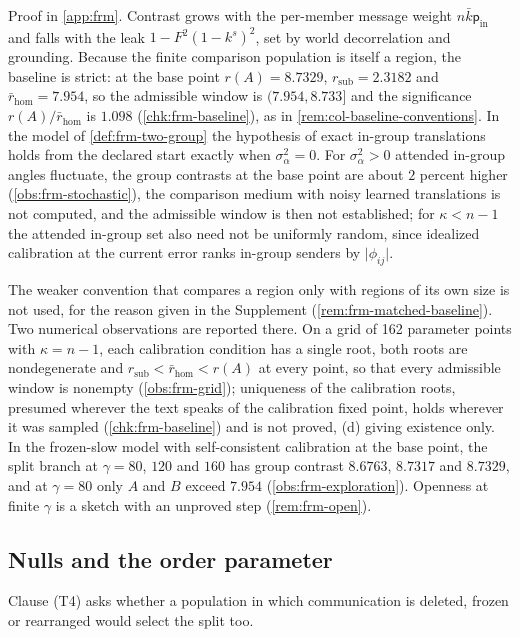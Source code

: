 Proof in \cref{app:frm}. Contrast grows with the per-member message weight $n\bar k\mathsf p_{\mathrm{in}}$ and falls with the leak $1-F^2(1-k^s)^2$, set by world decorrelation and grounding. Because the finite comparison population is itself a region, the baseline is strict: at the base point $r(A)=8.7329$, $r_{\mathrm{sub}}=2.3182$ and $\bar r_{\mathrm{hom}}=7.954$, so the admissible window is $(7.954,8.733]$ and the significance $r(A)/\bar r_{\mathrm{hom}}$ is $1.098$ (\cref{chk:frm-baseline}), as in \cref{rem:col-baseline-conventions}. In the model of \cref{def:frm-two-group} the hypothesis of exact in-group translations holds from the declared start exactly when $\sigma_\alpha^2=0$. For $\sigma_\alpha^2>0$ attended in-group angles fluctuate, the group contrasts at the base point are about $2$ percent higher (\cref{obs:frm-stochastic}), the comparison medium with noisy learned translations is not computed, and the admissible window is then not established; for $\kappa<n-1$ the attended in-group set also need not be uniformly random, since idealized calibration at the current error ranks in-group senders by $\lvert\phi_{ij}\rvert$.

The weaker convention that compares a region only with regions of its own size is not used, for the reason given in the Supplement (\cref{rem:frm-matched-baseline}). Two numerical observations are reported there. On a grid of 162 parameter points with $\kappa=n-1$, each calibration condition has a single root, both roots are nondegenerate and $r_{\mathrm{sub}}<\bar r_{\mathrm{hom}}<r(A)$ at every point, so that every admissible window is nonempty (\cref{obs:frm-grid}); uniqueness of the calibration roots, presumed wherever the text speaks of the calibration fixed point, holds wherever it was sampled (\cref{chk:frm-baseline}) and is not proved, (d) giving existence only. In the frozen-slow model with self-consistent calibration at the base point, the split branch at $\gamma=80$, $120$ and $160$ has group contrast $8.6763$, $8.7317$ and $8.7329$, and at $\gamma=80$ only $A$ and $B$ exceed $7.954$ (\cref{obs:frm-exploration}). Openness at finite $\gamma$ is a sketch with an unproved step (\cref{rem:frm-open}).

\subsection{Nulls and the order parameter}\label{sec:frm-nulls}

Clause (T4) asks whether a population in which communication is deleted, frozen or rearranged would select the split too.

